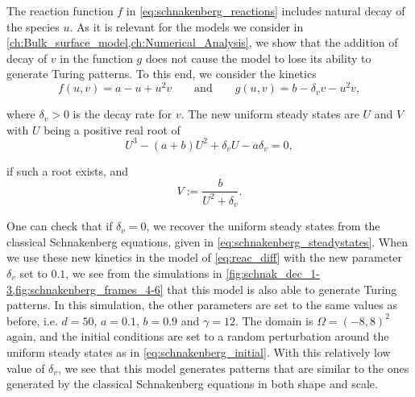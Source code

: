 The reaction function $f$ in \cref{eq:schnakenberg_reactions} includes natural decay of the species $u$. As it is relevant for the models we consider in \cref{ch:Bulk_surface_model,ch:Numerical_Analysis}, we show that the addition of decay of $v$ in the function $g$ does not cause the model to lose its ability to generate Turing patterns. To this end, we consider the kinetics
%
\begin{equation}
    f(u, v) = a - u + u^2 v \qquad \text{and} \qquad g(u, v) = b - \delta_v v - u^2 v,
\end{equation}

\noindent
where $\delta_v > 0$ is the decay rate for $v$. The new uniform steady states are $U$ and $V$ with $U$ being a positive real root of
%
\begin{equation*}
    U^3 - (a + b)U^2 + \delta_v U - a \delta_v = 0,
\end{equation*}

\noindent
if such a root exists, and
%
\begin{equation*}
    V := \frac{b}{U^2 + \delta_v}.
\end{equation*}

\noindent
One can check that if $\delta_v = 0$, we recover the uniform steady states from the classical Schnakenberg equations, given in \cref{eq:schnakenberg_steadystates}. When we use these new kinetics in the model of \cref{eq:reac_diff} with the new parameter $\delta_v$ set to $0.1$, we see from the simulations in \cref{fig:schnak_dec_1-3,fig:schnakenberg_frames_4-6} that this model is also able to generate Turing patterns. In this simulation, the other parameters are set to the same values as before, i.e. $d = 50$, $a = 0.1$, $b = 0.9$ and $\gamma = 12$. The domain is $\Omega = (-8, 8)^2$ again, and the initial conditions are set to a random perturbation around the uniform steady states as in \cref{eq:schnakenberg_initial}. With this relatively low value of $\delta_v$, we see that this model generates patterns that are similar to the ones generated by the classical Schnakenberg equations in both shape and scale.

